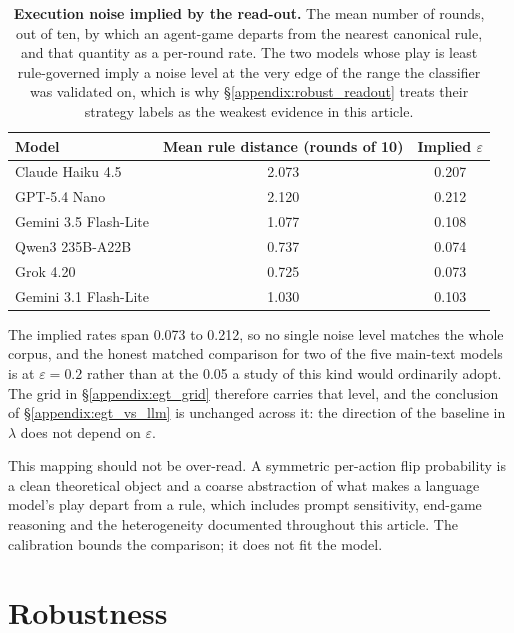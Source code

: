 \documentclass[openacc]{rsproca_new}
\newcommand{\lam}{\lambda}
\begin{document}
\begin{table}[htbp]
\centering
\footnotesize
\caption{\textbf{Execution noise implied by the read-out.} The mean number of
rounds, out of ten, by which an agent-game departs from the nearest canonical
rule, and that quantity as a per-round rate. The two models whose play is least
rule-governed imply a noise level at the very edge of the range the classifier
was validated on, which is why \S\ref{appendix:robust_readout} treats their
strategy labels as the weakest evidence in this article.}
\label{tab:A-egtcalib}
\begin{tabular}{@{}lcc@{}}
\toprule
Model & Mean rule distance (rounds of 10) & Implied $\varepsilon$ \\
\midrule
Claude Haiku 4.5      & 2.073 & 0.207 \\
GPT-5.4 Nano          & 2.120 & 0.212 \\
Gemini 3.5 Flash-Lite & 1.077 & 0.108 \\
Qwen3 235B-A22B       & 0.737 & 0.074 \\
Grok 4.20             & 0.725 & 0.073 \\
Gemini 3.1 Flash-Lite & 1.030 & 0.103 \\
\bottomrule
\end{tabular}
\end{table}

The implied rates span 0.073 to 0.212, so no single noise level matches the
whole corpus, and the honest matched comparison for two of the five main-text
models is at $\varepsilon = 0.2$ rather than at the 0.05 a study of this kind
would ordinarily adopt. The grid in \S\ref{appendix:egt_grid} therefore carries
that level, and the conclusion of \S\ref{appendix:egt_vs_llm} is unchanged
across it: the direction of the baseline in $\lam$ does not depend on
$\varepsilon$.

This mapping should not be over-read. A symmetric per-action flip probability
is a clean theoretical object and a coarse abstraction of what makes a language
model's play depart from a rule, which includes prompt sensitivity, end-game
reasoning and the heterogeneity documented throughout this article. The
calibration bounds the comparison; it does not fit the model.


\section{Robustness}\label{appendix:robustness}
\end{document}
